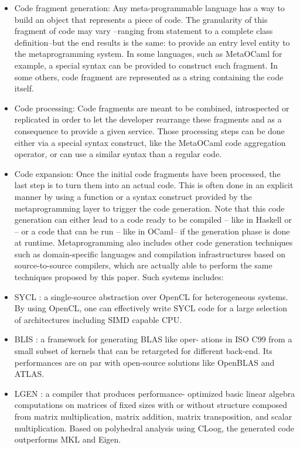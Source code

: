 \documentclass[../../main.tex]{subfiles}
\begin{document}
\begin{itemize}
\item Code fragment generation: Any meta-programmable
language has a way to build an object that represents a
piece of code. The granularity of this fragment of code
may vary –ranging from statement to a complete class
definition–but the end results is the same: to provide
an entry level entity to the metaprogramming system.
In some languages, such as MetaOCaml for example,
a special syntax can be provided to construct such
fragment. In some others, code fragment are represented
as a string containing the code itself.

\item Code processing: Code fragments are meant to
be combined, introspected or replicated in order to
let the developer rearrange these fragments and as a
consequence to provide a given service. Those processing
steps can be done either via a special syntax construct,
like the MetaOCaml code aggregation operator, or can
use a similar syntax than a regular code.

\item Code expansion: Once the initial code fragments have
been processed, the last step is to turn them into an
actual code. This is often done in an explicit manner by
using a function or a syntax construct provided by the
metaprogramming layer to trigger the code generation.
Note that this code generation can either lead to a code
ready to be compiled – like in Haskell or \cpp– or a
code that can be run – like in OCaml– if the generation
phase is done at runtime.
Metaprogramming also includes other code generation
techniques such as domain-specific languages and compilation
infrastructures based on source-to-source compilers, which
are actually able to perform the same techniques proposed by
this paper. Such systems includes:

\item SYCL \cite{hpcs13}: a single-source abstraction over OpenCL
for heterogeneous systems. By using OpenCL, one can
effectively write SYCL code for a large selection of
architectures including SIMD capable CPU.

\item BLIS \cite{hpcs14}: a framework for generating BLAS like oper-
ations in ISO C99 from a small subset of kernels that can
be retargeted for different back-end. Its performances are
on par with open-source solutions like OpenBLAS and
ATLAS.

\item LGEN \cite{hpcs15}: a compiler that produces performance-
optimized basic linear algebra computations on matrices
of fixed sizes with or without structure composed
from matrix multiplication, matrix addition, matrix
transposition, and scalar multiplication. Based on
polyhedral analysis using CLoog, the generated code
outperforms MKL and Eigen.
\end{itemize}
\end{document}
